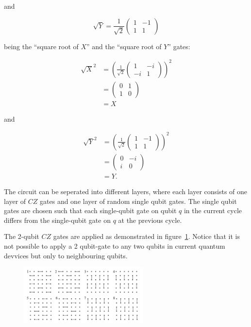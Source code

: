 and

\begin{equation}
  \sqrt{Y} = \frac{1}{\sqrt{2}} \begin{pmatrix}
    1 & -1  \\
    1 & 1 
  \end{pmatrix}
\end{equation}

being the ``square root of $X$'' and the ``square root of $Y$'' gates:

\begin{align}
  \sqrt{X}^2 &= (\frac{1}{\sqrt{2}} \begin{pmatrix}
    1 & - i \\
    - i & 1
  \end{pmatrix})^2 \\
  &= \begin{pmatrix}
    0 & 1 \\
    1 & 0
  \end{pmatrix} \\
  &= X
\end{align}

and

\begin{align}
  \sqrt{Y}^2 &= (\frac{1}{\sqrt{2}} \begin{pmatrix}
    1 & -1 \\
    1 & 1
  \end{pmatrix})^2 \\
  &= \begin{pmatrix}
    0 & -i \\
    i & 0
  \end{pmatrix} \\
  &= Y.
\end{align}

The circuit can be seperated into different layers, where each layer consists of one
layer of $CZ$ gates and one layer of random single qubit gates. The single qubit
gates are chosen such that each single-qubit gate on qubit $q$ in the current
cycle differs from the single-qubit gate on $q$ at the previous cycle.

The 2-qubit $CZ$ gates are applied as demonstrated in figure~\ref{fig:czgates}.
Notice that it is not possible to apply a 2 qubit-gate to any two qubits in
current quantum devvices but only to neighbouring qubits.

\begin{figure}[H]
  \centering
  \label{fig:czgates}
  \includegraphics[width=0.58\textwidth]{figures/cz_order}
\end{figure}

